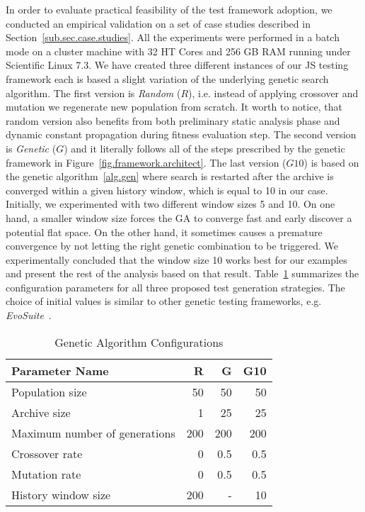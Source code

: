\documentclass[sigconf]{acmart}
\begin{document}
In order to evaluate practical feasibility of the test framework adoption, we conducted an empirical validation on a set of case studies described in Section~\ref{sub.sec.case.studies}. All the experiments were performed in a batch mode on a cluster machine with 32 HT Cores and 256 GB RAM running under Scientific Linux 7.3. We have created three different instances of our JS testing framework each is based a slight variation of the underlying genetic search algorithm. The first version is \emph{Random} ($R$), i.e. instead of applying crossover and mutation we regenerate new population from scratch. It worth to notice, that random version also benefits from both preliminary static analysis phase and dynamic constant propagation during fitness evaluation step. The second version is \emph{Genetic} ($G$) and it literally follows all of the steps prescribed by the genetic framework in Figure~\ref{fig.framework.architect}. The last version ($G10$) is based on the genetic algorithm~\ref{alg.gen} where search is restarted after the archive is converged within a given history window, which is equal to 10 in our case. Initially, we experimented with two different window sizes 5 and 10. On one hand, a smaller window size forces the GA to converge fast and early discover a potential flat space. On the other hand, it sometimes causes a premature convergence by not letting the right genetic combination to be triggered. We experimentally concluded that the window size 10 works best for our examples and present the rest of the analysis based on that result. Table~\ref{tbl.gen.config} summarizes the configuration parameters for all three proposed test generation strategies. The choice of initial values is similar to other genetic testing frameworks, e.g. \emph{EvoSuite}~\cite{evosuite}. 

\begin{table}
  \caption{Genetic Algorithm Configurations}
  \label{tbl.gen.config}
    \scriptsize
  \begin{tabular}{l|r|r|r}
    \toprule
    \textbf{Parameter Name} & \textbf{R} & \textbf{G} & \textbf{G10} \\
    \hline
    Population size                   & 50  & 50  & 50  \\
    Archive size                      & 1   & 25  & 25  \\
    Maximum number of generations     & 200 & 200 & 200 \\
    Crossover rate                    & 0   & 0.5 & 0.5 \\
    Mutation rate                     & 0   & 0.5 & 0.5 \\
    History window size               & 200 & -   & 10  \\
    \bottomrule
  \end{tabular}
\end{table}
\end{document}
